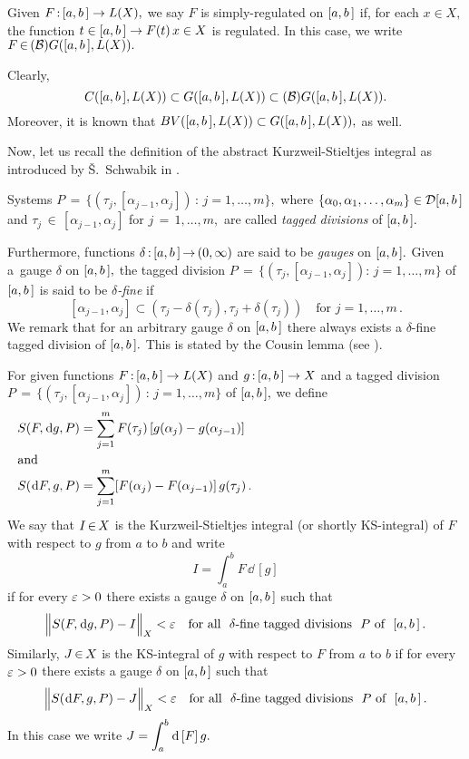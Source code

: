\documentclass[12pt,twoside]{article}
\numberwithin{equation}{section}
\theoremstyle{plain}
\theoremstyle{definition}
\begin{document}
{\skipaline

Given $F\,{:}\,[a,b\,]\to L(X),$ we say $F$ is simply-regulated on $[a,b\,]$ if, for each $x\in X,$
the function $t\in[a,b\,]\to F(t)\,x\in X$ is regulated. In this case, we write
$F\,{\in}\,(\mathcal{B})G([a,b\,],L(X)).$

\skipaline

Clearly,
\[
   C([a,b\,],L(X))\subset G([a,b\,],L(X))\subset(\mathcal{B})G([a,b\,],L(X)).
\]
Moreover, it is known that $BV([a,b\,],L(X))\subset G([a,b\,],L(X)),$ as well.

\skipaline

Now, let us recall the definition of the abstract Kurzweil-Stieltjes integral as introduced
by \v{S}.~Schwabik in \cite{Sch1}.

\smallskip

Systems $P\,{=}\,\{(\tau_j,[\alpha_{j-1},\alpha_j])\,{:}\,j=1,\dots,m\},$ where
$\{\alpha_0,\alpha_1,\dots,\alpha_m\}\in\mathcal{D}[a,b\,]$ and
$\tau_j\,{\in}\,[\alpha_{j{-}1},\alpha_j]$ for $j\,{=}\,1,\dots,m,$ are called
{\em tagged divisions} of $[a,b\,].$

\smallskip

Furthermore, functions $\delta\,{:}\,[a,b\,]\,{\to}\,(0,\infty)$ are said to be {\em gauges}
on $[a,b\,].$ Given a~gauge $\delta$ on $[a,b\,],$ the tagged division
$P\,{=}\,\{(\tau_j,[\alpha_{j-1},\alpha_j]){:}\,j=1,\dots,m\}$ of $[a,b\,]$ is said to be
{\em $\delta$-fine} if
\[
   [\alpha_{j-1},\alpha_j]\subset(\tau_j-\delta(\tau_j),\tau_j+\delta(\tau_j))
   \quad\mbox{for \ } j=1,\dots,m\,.
\]
We remark that for an arbitrary gauge $\delta$ on $[a,b\,]$ there always exists a $\delta$-fine
tagged division of $[a,b\,].$ This is stated by the Cousin lemma (see \cite[Lemma 1.4]{Sch}).

\smallskip

For given functions $F\,{:}\,[a,b\,]\to L(X)$ and $g\,{:}\,[a,b\,]\to X$ and a tagged division
$P\,{=}\,\{(\tau_j,[\alpha_{j-1},\alpha_j])\,{:}\,j=1,\dots,m\}$ of $[a,b\,],$ we define
\begin{align*}
   &S(F,\dd g,P)=\sum_{j=1}^m F(\tau_j)\,[g(\alpha_j)-g(\alpha_{j-1})]
  \\\noalign{\noindent\mbox{and}}
   &S(\dd F,g,P)=\sum_{j=1}^m[F(\alpha_j)-F(\alpha_{j-1})]\,g(\tau_j)\,.
\end{align*}
We say that $I\,{\in}\, X$ is the Kurzweil-Stieltjes integral (or shortly KS-integral)
of $F$ with respect to $g$ from $a$ to $b$ and write
\[
   I=\int_a^bF\,\dd\,[g]
\]
if for every $\varepsilon>0$ there exists a gauge $\delta$ on $[a,b\,]$ such that
\[
   \Big\|S(F,\hskip0.2mm\mbox{\rm d} g,P)-I\Big\|_X<\varepsilon
   \quad\mbox{for all \ } \delta\mbox{-fine tagged divisions \ } P \mbox{\ of \ }[a,b\,]\,.
\]
Similarly, $J\,{\in}\, X$ is the KS-integral of $g$ with respect to $F$ from $a$ to $b$
if for every $\varepsilon>0$ there exists a gauge $\delta$ on $[a,b\,]$ such that
\[
   \Big\|S(\hskip0.2mm\mbox{\rm d} F,g,P)-J\Big\|_X<\varepsilon
   \quad\mbox{for all \ } \delta\mbox{-fine tagged divisions \ } P \mbox{\ of \ }[a,b\,]\,.
\]
In this case we write $\displaystyle J=\int_a^b\hskip0.2mm\mbox{\rm d}\,[F]\,g.$

}
\end{document}

